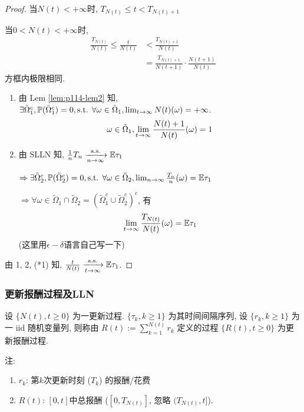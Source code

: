 \begin{proof}
    当$N(t)<+\infty$时, $T_{N(t)}\leq t<T_{N(t)+1}$

    当$0<N(t)<+\infty$时,
    \[
    \begin{aligned}
        \boxed{\frac{T_{N(t)}}{N(t)}}\leq \frac{t}{N(t)}&<\frac{T_{N(t)+1}}{N(t)}\\
        &=\boxed{\frac{T_{N(t)+1}}{N(t+1)}}\cdot \frac{N(t+1)}{N(t)}
    \end{aligned}
    \tag{*1}
    \]
    方框内极限相同.
    \begin{enumerate}
        \item 由 Lem \ref{lem:p114-lem2} 知, $\exists \tilde{\Omega}_1^c,\mathbb{P}(\tilde{\Omega}_1^c)=0,\text{s.t. } \forall \omega\in \tilde{\Omega}_1, \lim_{t \to \infty}N(t)(\omega)=+\infty$.
        \[
        \omega\in\tilde{\Omega}_1,\lim_{t \to \infty}\frac{N(t)+1}{N(t)}(\omega)=1
        \]
        \item 由 SLLN 知, $\frac{1}{n}T_n\xrightarrow[n\to\infty]{\text{a.s.}}\mathbb E\tau_1$
        
        $\Rightarrow \exists \tilde{\Omega}_2^c, \mathbb{P}(\tilde{\Omega}_2^c)=0,\text{s.t. } \forall \omega\in\tilde{\Omega}_2, \lim_{n \to \infty}\frac{T_n}{n}(\omega)=\mathbb E\tau_1$

        $\Rightarrow \forall \omega\in\tilde{\Omega}_1\cap \tilde{\Omega}_2=(\tilde{\Omega}_1^c\cup \tilde{\Omega}_2^c)^c$, 有
        \[
        \lim_{t \to \infty}\frac{T_{N(t)}}{N(t)}(\omega)=\mathbb E\tau_1
        \]
        (这里用$\epsilon-\delta$语言自己写一下)
    \end{enumerate}
    由 1, 2, (*1) 知, $\frac{t}{N(t)}\xrightarrow[t\to\infty]{\text{a.s.}}\mathbb E\tau_1$.
\end{proof}

\subsubsection{更新报酬过程及LLN}

\begin{definition}
    设 $\{N(t),t\geq 0\}$ 为一更新过程. $\{\tau_k, k\geq 1\}$ 为其时间间隔序列, 设 $\{r_k,k\geq 1\}$ 为一 iid 随机变量列, 则称由 $R(t):=\sum_{k=1}^{N(t)}r_k$ 定义的过程 $\{R(t),t\geq 0\}$ 为更新报酬过程.
\end{definition}
注:
\begin{enumerate}
    \item $r_k$: 第$k$次更新时刻 ($T_k$) 的报酬/花费
    \item $R(t)$: $[0,t]$中总报酬 ($[0,T_{N(t)}]$, 忽略 $(T_{N(t)},t]$).
\end{enumerate}

